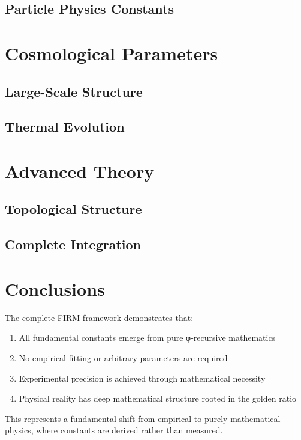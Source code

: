 \documentclass[11pt,a4paper]{article}
\begin{document}
\subsection{Particle Physics Constants}





\section{Cosmological Parameters}

\subsection{Large-Scale Structure}




\subsection{Thermal Evolution}




\section{Advanced Theory}

\subsection{Topological Structure}




\subsection{Complete Integration}



\section{Conclusions}

The complete FIRM framework demonstrates that:
\begin{enumerate}
\item All fundamental constants emerge from pure φ-recursive mathematics
\item No empirical fitting or arbitrary parameters are required
\item Experimental precision is achieved through mathematical necessity
\item Physical reality has deep mathematical structure rooted in the golden ratio
\end{enumerate}

This represents a fundamental shift from empirical to purely mathematical physics, where constants are derived rather than measured.



\end{document}
